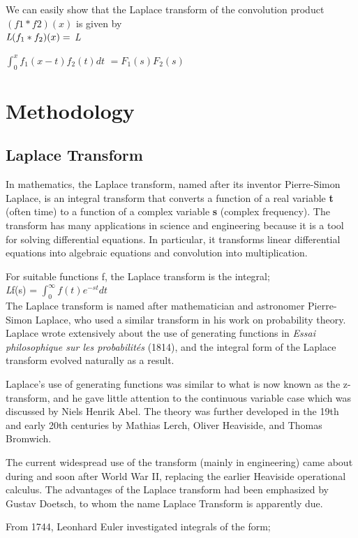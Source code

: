 \documentclass[12pt]{article}
\begin{document}
We can easily show that the Laplace transform of the convolution product $(f1 * f2)(x)$ is given by \\

$\emph{L}{(f_1 * f_2)(x)} =$ \emph{L}{\(\int_{0}^{x} f_1(x - t) f_2(t) dt\) $= F_1(s)F_2(s)$
\newpage
\section{Methodology}
\subsection{Laplace Transform}
In mathematics, the Laplace transform, named after its inventor Pierre-Simon Laplace, is an integral transform that converts a function of a real variable \textbf{t} (often time) to a function of a complex variable \textbf{s} (complex frequency). The transform has many applications in science and engineering because it is a tool for solving differential equations. In particular, it transforms linear differential equations into algebraic equations and convolution into multiplication.

For suitable functions f, the Laplace transform is the integral;\\

\emph{L}{f}(s) = \(\int_{0}^{\infty} f(t) e^{-st} dt\)\\

The Laplace transform is named after mathematician and astronomer Pierre-Simon Laplace, who used a similar transform in his work on probability theory. Laplace wrote extensively about the use of generating functions in \emph{Essai philosophique sur les probabilités} (1814), and the integral form of the Laplace transform evolved naturally as a result.

Laplace's use of generating functions was similar to what is now known as the z-transform, and he gave little attention to the continuous variable case which was discussed by Niels Henrik Abel. The theory was further developed in the 19th and early 20th centuries by Mathias Lerch, Oliver Heaviside, and Thomas Bromwich.

The current widespread use of the transform (mainly in engineering) came about during and soon after World War II, replacing the earlier Heaviside operational calculus. The advantages of the Laplace transform had been emphasized by Gustav Doetsch, to whom the name Laplace Transform is apparently due.

From 1744, Leonhard Euler investigated integrals of the form;\\

}
\end{document}

